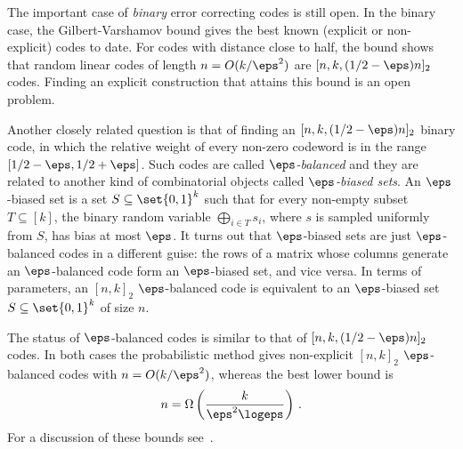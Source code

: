 The important case of \emph{binary} error correcting codes is still
open. In the binary case, the Gilbert-Varshamov bound gives the best
known (explicit or non-explicit) codes to date. For codes with
distance close to half, the bound shows that random linear codes
of length $n=O(k/\eps^2)$ are $[n,k,(1/2-\eps)n]_2$ codes. Finding
an explicit construction that attains this bound is an open problem.

Another closely related question is that of finding an
$[n,k,(1/2-\eps)n]_2$ binary code, in which the relative weight of
every non-zero codeword is in the range $[1/2-\eps,1/2+\eps]$.
Such codes are called \emph{$\eps$-balanced} and they are related to
another kind of combinatorial objects called \emph{$\eps$-biased
sets}. An $\eps$-biased set is a set $S \subseteq \set{0,1}^k$ such
that for every non-empty subset $T \subseteq [k]$, the binary random
variable $\bigoplus_{i \in T} s_i$, where $s$ is sampled uniformly
from $S$, has bias at most $\eps$. It turns out that $\eps$-biased
sets are just $\eps$-balanced codes in a different guise: the
%
%
rows of a matrix whose columns generate an $\eps$-balanced code form an $\eps$-biased set, and vice
versa. In terms of parameters, an $[n,k]_2$ $\eps$-balanced code is
equivalent to an $\eps$-biased set $S \subseteq \set{0,1}^k$ of size
$n$.

The status of $\eps$-balanced codes is similar to that of
$[n,k,(1/2-\eps)n]_2$ codes. In both cases the probabilistic
method gives non-explicit $[n,k]_2$ $\eps$-balanced codes with
$n=O({k / \eps^2})$, whereas the best lower bound is
\[
n=\Omega\left(\frac{k}{\eps^2 \logeps}\right)\,.
\] For a discussion of these
bounds see~\cite[Section 7]{AGHP:92}.
